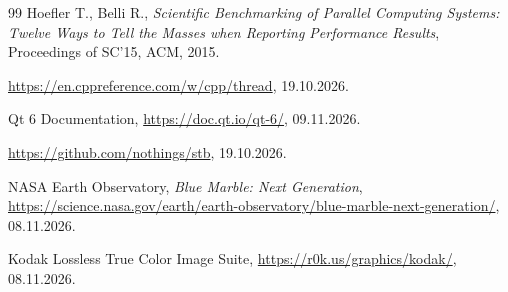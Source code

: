 \documentclass[12pt,a4paper]{article}
\begin{document}
\begin{thebibliography}{99}
	Hoefler T., Belli R., \emph{Scientific Benchmarking of Parallel Computing Systems: Twelve Ways to Tell the Masses when Reporting Performance Results}, Proceedings of SC'15, ACM, 2015.

	\url{https://en.cppreference.com/w/cpp/thread}, 19.10.2026.

	Qt 6 Documentation, \url{https://doc.qt.io/qt-6/}, 09.11.2026.

	\url{https://github.com/nothings/stb}, 19.10.2026.

	NASA Earth Observatory, \emph{Blue Marble: Next Generation}, \url{https://science.nasa.gov/earth/earth-observatory/blue-marble-next-generation/}, 08.11.2026.

	Kodak Lossless True Color Image Suite, \url{https://r0k.us/graphics/kodak/}, 08.11.2026.
\end{thebibliography}
\end{document}
